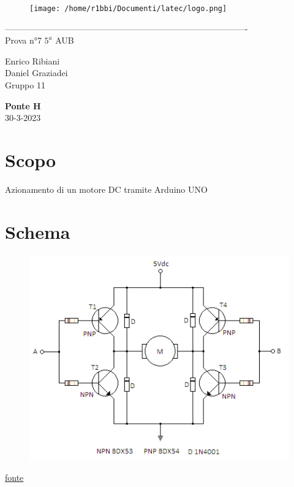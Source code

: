 \documentclass[12pt]{article}
\begin{document}
\begin{titlepage}
	\begin{center}
		\begin{figure}
			\centering
			\texttt{[image: /home/r1bbi/Documenti/latec/logo.png]}

		\end{figure}
		-------------------------------------------------------------------------------------\\
		\vspace{2\baselineskip}
		\large Prova n°7
		\hfill
		\large $5^a$   AUB\\
		\begin{flushleft}
			\large Enrico Ribiani\\
			\large Daniel Graziadei\\
			\large Gruppo 11\\
		\end{flushleft}


		\vfill

		\Huge{\textbf{Ponte H}}\\
		\vfill
		\vfill
		\large{30-3-2023}
	\end{center}
\end{titlepage}
\thispagestyle{empty}
\tableofcontents
\newpage
\setcounter{page}{1}
\vskip 1cm
\section{Scopo}
Azionamento di un motore DC tramite Arduino UNO

\section{Schema}

\begin{figure}[!h]
	\includegraphics[scale=0.7]{schema.PNG}
\end{figure}
\href{https://www.google.com/url?sa=i&url=https%3A%2F%2Flogicaprogrammabile.it%2Fpilotare-motore-dc-tramite-ponte-h%2F&psig=AOvVaw3HWeGK16jnlvwXhPIfXFen&ust=1681318364866000&source=images&cd=vfe&ved=0CBMQjhxqFwoTCMipiJelov4CFQAAAAAdAAAAABAD}{fonte}
\end{document}
